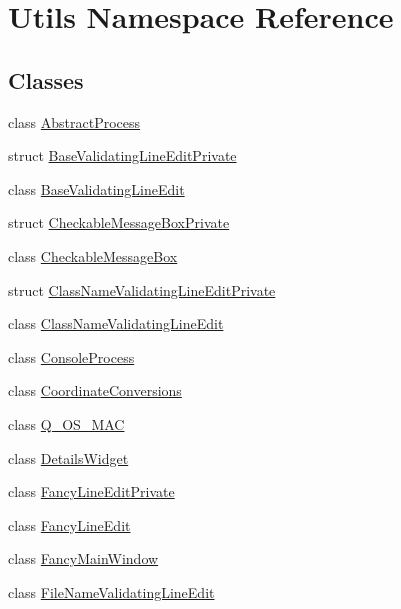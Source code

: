 \hypertarget{namespace_utils}{\section{\-Utils \-Namespace \-Reference}
\label{namespace_utils}
}
\subsection*{\-Classes}
\begin{DoxyCompactItemize}
\item 
class \hyperlink{class_utils_1_1_abstract_process}{\-Abstract\-Process}
\item 
struct \hyperlink{struct_utils_1_1_base_validating_line_edit_private}{\-Base\-Validating\-Line\-Edit\-Private}
\item 
class \hyperlink{class_utils_1_1_base_validating_line_edit}{\-Base\-Validating\-Line\-Edit}
\item 
struct \hyperlink{struct_utils_1_1_checkable_message_box_private}{\-Checkable\-Message\-Box\-Private}
\item 
class \hyperlink{class_utils_1_1_checkable_message_box}{\-Checkable\-Message\-Box}
\item 
struct \hyperlink{struct_utils_1_1_class_name_validating_line_edit_private}{\-Class\-Name\-Validating\-Line\-Edit\-Private}
\item 
class \hyperlink{class_utils_1_1_class_name_validating_line_edit}{\-Class\-Name\-Validating\-Line\-Edit}
\item 
class \hyperlink{class_utils_1_1_console_process}{\-Console\-Process}
\item 
class \hyperlink{class_utils_1_1_coordinate_conversions}{\-Coordinate\-Conversions}
\item 
class \hyperlink{class_utils_1_1_q___o_s___m_a_c}{\-Q\-\_\-\-O\-S\-\_\-\-M\-A\-C}
\item 
class \hyperlink{class_utils_1_1_details_widget}{\-Details\-Widget}
\item 
class \hyperlink{class_utils_1_1_fancy_line_edit_private}{\-Fancy\-Line\-Edit\-Private}
\item 
class \hyperlink{class_utils_1_1_fancy_line_edit}{\-Fancy\-Line\-Edit}
\item 
class \hyperlink{class_utils_1_1_fancy_main_window}{\-Fancy\-Main\-Window}
\item 
class \hyperlink{class_utils_1_1_file_name_validating_line_edit}{\-File\-Name\-Validating\-Line\-Edit}
\item 

\end{DoxyCompactItemize}
